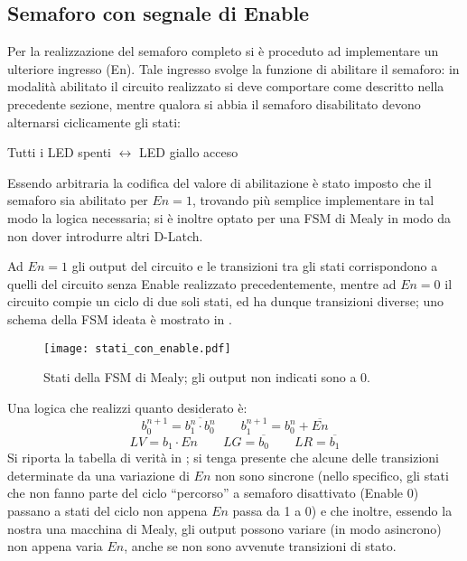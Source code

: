 \subsection{Semaforo con segnale di Enable}

Per la realizzazione del semaforo completo si è proceduto ad implementare un ulteriore ingresso (En). Tale ingresso svolge la funzione di abilitare il semaforo: in modalità abilitato il circuito realizzato si deve comportare come descritto
nella precedente sezione, mentre qualora si abbia il semaforo disabilitato devono alternarsi ciclicamente gli stati:
\begin{center}
Tutti i LED spenti $\longleftrightarrow$ LED giallo acceso
\end{center}
Essendo arbitraria la codifica del valore di abilitazione è stato imposto che il semaforo sia abilitato
per $En = 1$, trovando più semplice implementare in tal modo la logica necessaria; si è inoltre optato per una FSM di Mealy in modo da non dover introdurre altri D-Latch.

Ad $En = 1$ gli output del circuito e le transizioni tra gli stati corrispondono a quelli del circuito senza Enable realizzato precedentemente, mentre ad $En = 0$ il circuito compie un ciclo di due soli stati, ed ha dunque transizioni diverse; uno schema della FSM ideata è mostrato in .

\begin{figure}[h]
	\centering
	\texttt{[image: stati\_con\_enable.pdf]}
	\caption{Stati della FSM di Mealy; gli output non indicati sono a 0.}
	\label{fig:enstates}
\end{figure}

Una logica che realizzi quanto desiderato è:
$$b_0^{n+1} =  \overline{b_{1}^{n} \cdot b_{0}^{n}} \qquad b_1^{n+1} = b_0^{n} + \overline{En}$$
$$LV = b_1 \cdot En \qquad LG = \overline{b_0} \qquad LR = \overline{b_1}$$
Si riporta la tabella di verità in ; si tenga presente che alcune delle transizioni determinate da una variazione di $En$ non sono sincrone (nello specifico, gli stati che non fanno parte del ciclo ``percorso'' a semaforo disattivato (Enable 0) passano a stati del ciclo non appena $En$ passa da 1 a 0) e che inoltre, essendo la nostra una macchina di Mealy, gli output possono variare (in modo asincrono) non appena varia $En$, anche se non sono avvenute transizioni di stato.

